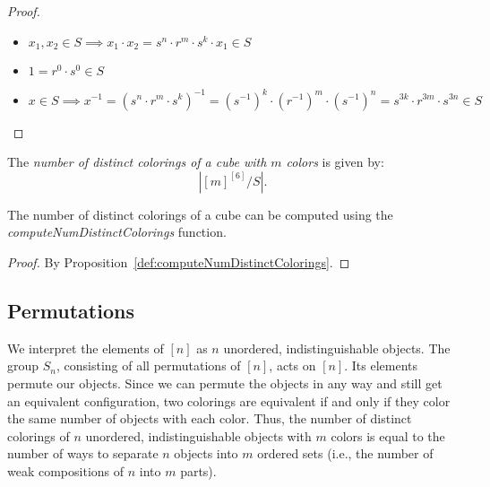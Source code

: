 \begin{proof}
  \leanok
  \begin{itemize}
    \item $x_1, x_2 \in S \implies x_1 \cdot x_2 = s^n \cdot r^m \cdot s^k \cdot x_1 \in S$

    \item $1 = r^0 \cdot s^0 \in S$

    \item $x \in S \implies x^{-1} = (s^n \cdot r^m \cdot s^k)^{-1} = (s^{-1})^k \cdot (r^{-1})^m \cdot (s^{-1})^n = s^{3k} \cdot r^{3m} \cdot s^{3n} \in S$
  \end{itemize}
\end{proof}

\begin{definition}
  \label{def:numDistinctColoringsOfCube}
  \leanok
  The \emph{number of distinct colorings of a cube with $m$ colors} is given by:
  \begin{equation*}
    |[m]^{[6]} / S|.
  \end{equation*}
\end{definition}

\begin{proposition}
  \label{prop:computeNumDistinctColoringsOfCube-eq-numDistinctColoringsOfCube}
  \leanok
  The number of distinct colorings of a cube can be computed using the \emph{computeNumDistinctColorings} function.
\end{proposition}

\begin{proof}
  \leanok
  By Proposition~\ref{def:computeNumDistinctColorings}.
\end{proof}

\subsection{Permutations}

We interpret the elements of $[n]$ as $n$ unordered, indistinguishable objects. The group $S_n$, consisting of all permutations of $[n]$, acts on $[n]$. Its elements permute our objects. Since we can permute the objects in any way and still get an equivalent configuration, two colorings are equivalent if and only if they color the same number of objects with each color. Thus, the number of distinct colorings of $n$ unordered, indistinguishable objects with $m$ colors is equal to the number of ways to separate $n$ objects into $m$ ordered sets (i.e., the number of weak compositions of $n$ into $m$ parts). 

